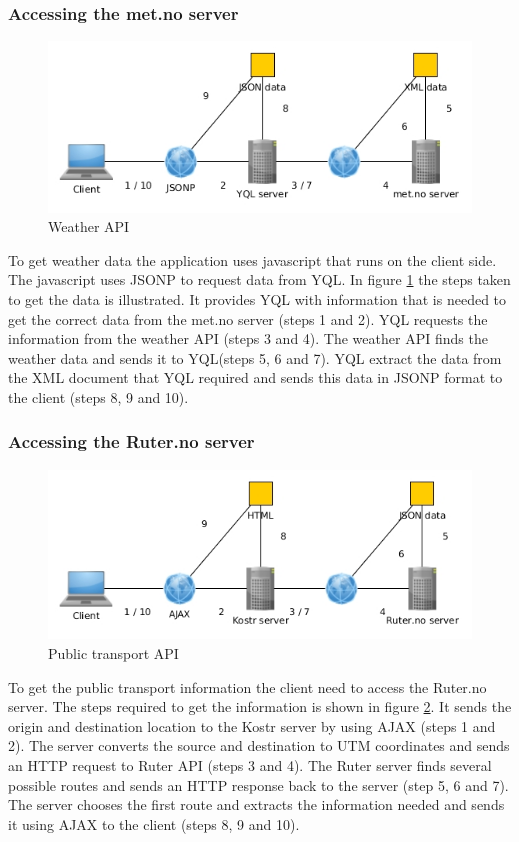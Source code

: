 \documentclass[10pt,a4paper]{article}
\begin{document}
\subsubsection{Accessing the met.no server}
\label{sec:access-weath-api}
\begin{figure}
\centering
\includegraphics[width=\textwidth]{../weather/access}

\caption{Weather API}
\label{fig:weather}
\end{figure}

To get weather data the application uses javascript that runs on the client side. The javascript uses JSONP to request data from YQL. In figure \ref{fig:weather} the steps taken to get the data is illustrated. It provides YQL with information that is needed to get the correct data from the met.no server (steps 1 and 2). YQL requests the information from the weather API (steps 3 and 4). The weather API finds the weather data and sends it to YQL(steps 5, 6 and 7). YQL extract the data from the XML document that YQL required and sends this data in JSONP format to the client (steps 8, 9 and 10).

\subsubsection{Accessing the Ruter.no server}
\label{sec:access-publ-transp}
\begin{figure}
\centering
\includegraphics[width=\textwidth]{../ruter/access}
\caption{Public transport API}
\label{fig:public}
\end{figure}
To get the public transport information the client need to access the Ruter.no server. The steps required to get the information is shown in figure \ref{fig:public}. It sends the origin and destination location to the Kostr server by using AJAX (steps 1 and 2). The server converts the source and destination to UTM coordinates and sends an HTTP request to Ruter API (steps 3 and 4). The Ruter server finds several possible routes and sends an HTTP response back to the server (step 5, 6 and 7). The server chooses the first route and extracts the information needed and sends it using AJAX to the client (steps 8, 9 and 10).
\end{document}
